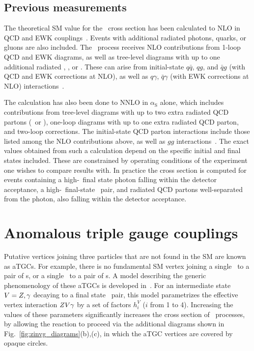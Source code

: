 \documentclass[oneside, letterpaper, 12pt, oldfontcommands]{memoir}
\begin{document}
\subsection{Previous measurements} \label{sec:introduction_znng_previous_measurements}
The theoretical SM value for the \zinvg\ cross section has been calculated to NLO in QCD and EWK couplings~\cite{ref:JHEP04(2015)018, ref:JHEP02(2016)057}.
Events with additional radiated photons, quarks, or gluons are also included.
The \zinvg\ process receives NLO contributions from 1-loop QCD and EWK diagrams, as well as tree-level diagrams with up to one additional radiated \Pgamma, \Pq, or \Pg.
These can arise from initial-state $q\bar{q}$, $qg$, and $\bar{q}g$ (with QCD and EWK corrections at NLO), as well as $q\gamma$, $\bar{q}\gamma$ (with EWK corrections
at NLO) interactions~\cite{ref:JHEP02(2016)057}.

The calculation has also been done to NNLO in $\alpha_\mathrm{S}$ alone,
which includes contributions from tree-level diagrams with up to two extra radiated QCD partons (\Pq\ or \Pg), one-loop diagrams with up to one extra
radiated QCD parton, and two-loop corrections. The initial-state QCD parton interactions include those listed among the NLO contributions above,
as well as $gg$ interactions~\cite{ref:j.physletb.2014.02.037, ref:10.1007/JHEP07(2015)085}.
The exact values obtained from such a calculation depend on the specific initial and final states included. These are constrained by operating conditions
of the experiment one wishes to compare results with. In practice the cross section is computed for events containing a high-\pT\ final state photon falling within
the detector acceptance, a high-\pT\ final-state \Pn\Pan\ pair, and radiated QCD partons well-separated from the photon, also falling within the detector acceptance.



\section{Anomalous triple gauge couplings} \label{sec:introduction_aTGC}
Putative vertices joining three particles that are not found in the SM are known as aTGCs. For example, there is no fundamental SM vertex
joining a single \Pgamma\ to a pair of \PZ s, or a single \PZ\ to a pair of \Pgamma s. A model
describing the generic phenomenology of these aTGCs is developed in~\cite{ref:Nucl.Phys.0550-3213_87_90685-7, ref:PhysRevD.47.4889, ref:PhysRevD.62.113011}.
For an intermediate state $V = Z,\gamma$ decaying to a final state \PZ\Pgamma\ pair, this model parametrizes the effective vertex interaction $Z V\gamma$
by a set of factors $h_{i}^{V}$ ($i$ from 1 to 4). Increasing the values of these parameters significantly increases the cross section
of \zinvg\ processes, by allowing the reaction to proceed via the additional diagrams shown in Fig.~\ref{fig:zinvg_diagrams}(b),(c),
in which the aTGC vertices are covered by opaque circles.
\end{document}
